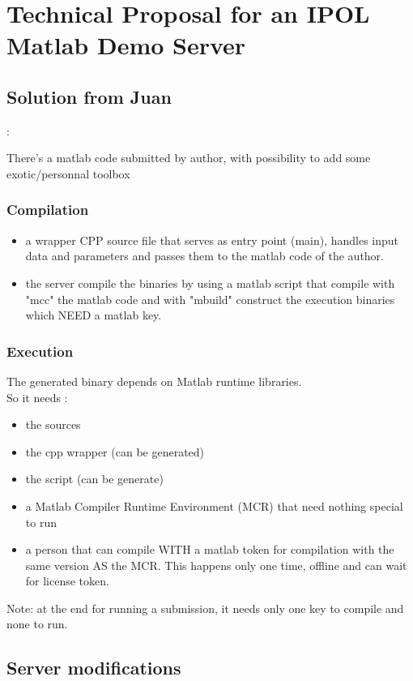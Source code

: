 \chapter{Technical Proposal for an IPOL Matlab Demo Server}


\section{Solution from Juan}:

There's a matlab code submitted by author, with possibility to add some exotic/personnal toolbox

\subsection{Compilation}
\begin{itemize}
\item a wrapper CPP source file that serves as entry point (main), handles input data and parameters and passes them to the matlab code of the author.
\item the server compile the binaries by using a matlab script that compile with "mcc" the matlab code and with "mbuild" construct the execution binaries which NEED a matlab key.
\end{itemize}


\subsection{Execution}
The generated binary depends on Matlab runtime libraries.\\

So it needs :
\begin{itemize}
\item the sources
\item the cpp wrapper (can be generated)
\item the script (can be generate) 
\item a Matlab Compiler Runtime Environment (MCR) that need nothing special to run
\item a person that can compile WITH a matlab token for compilation with the same version AS the MCR. This happens only one time, offline and can wait for license token.
\end{itemize}

Note: at the end for running a submission, it needs only one key to compile and none to run.

\section{Server modifications}

